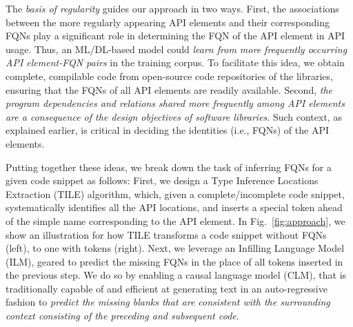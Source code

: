 
The {\em basis of regularity} guides our approach in two ways. First, the associations between the more regularly appearing API elements and their corresponding FQNs play a significant role in determining the FQN of the API element in API usage. Thus, an ML/DL-based model could {\em learn from more frequently occurring API element-FQN pairs} in the training corpus. To facilitate this idea, we obtain complete, compilable code from open-source code repositories of the libraries, ensuring that the FQNs of all API elements are readily available. Second, {\em the program dependencies and relations shared more frequently among API elements are a consequence of the design objectives of software libraries}. Such context, as explained earlier, is critical in deciding the identities (i.e., FQNs) of the API elements.


Putting together these ideas, we break down the task of inferring FQNs
for a given code snippet as follows: First, we design a Type Inference
Locations Extraction (TILE) algorithm, which, given a
complete/incomplete code snippet, systematically identifies all the
API locations, and inserts a special \code{[blank]} token ahead of the
simple name corresponding to the API element. In
Fig.~\ref{fig:approach}, we show an illustration for how TILE
transforms a code snippet without FQNs (left), to one with
\code{[blank]} tokens (right). Next, we leverage an Infilling Language
Model~\cite{donahue-etal-2020-enabling} (ILM), geared to predict the
missing FQNs in the place of all \code{[blank]} tokens inserted in the
previous step. We do so by enabling a causal language model (CLM),
that is traditionally capable of and efficient at generating text in
an auto-regressive fashion to {\em predict the missing blanks that are
consistent with the surrounding context consisting of the preceding
and subsequent code}.



